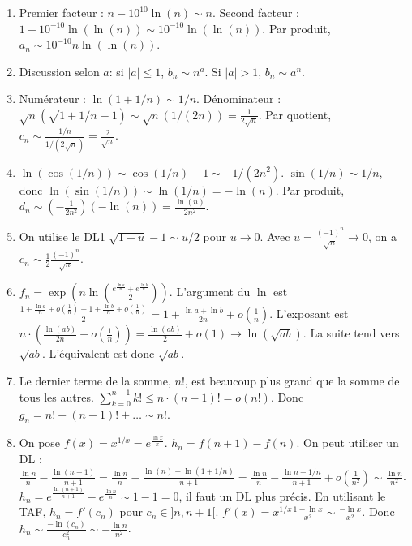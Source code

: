 \documentclass[solutions]{exercices}
\begin{document}
\begin{solution}
	\begin{enumerate}[]
		\item Premier facteur : $n - 10^{10} \ln(n) \sim n$. Second facteur : $1 + 10^{-10}\ln(\ln(n)) \sim 10^{-10}\ln(\ln(n))$. Par produit, $a_n \sim 10^{-10} n \ln(\ln(n))$.
		\item Discussion selon $a$: si $|a| \le 1$, $b_n \sim n^a$. Si $|a|>1$, $b_n \sim a^n$.
		\item Numérateur : $\ln(1+1/n) \sim 1/n$. Dénominateur : $\sqrt{n}(\sqrt{1+1/n}-1) \sim \sqrt{n}(1/(2n)) = \frac{1}{2\sqrt{n}}$.
		      Par quotient, $c_n \sim \frac{1/n}{1/(2\sqrt{n})} = \frac{2}{\sqrt{n}}$.
		\item $\ln(\cos(1/n)) \sim \cos(1/n)-1 \sim -1/(2n^2)$. $\sin(1/n) \sim 1/n$, donc $\ln(\sin(1/n)) \sim \ln(1/n) = -\ln(n)$.
		      Par produit, $d_n \sim (-\frac{1}{2n^2})(-\ln(n)) = \frac{\ln(n)}{2n^2}$.
		\item On utilise le DL1 $\sqrt{1+u}-1 \sim u/2$ pour $u\to 0$. Avec $u=\frac{(-1)^n}{\sqrt{n}} \to 0$, on a $e_n \sim \frac{1}{2}\frac{(-1)^n}{\sqrt{n}}$.
		\item $f_n = \exp\left(n\ln\left(\frac{e^{\frac{\ln a}{n}}+e^{\frac{\ln b}{n}}}{2}\right)\right)$.
		      L'argument du $\ln$ est $\frac{1+\frac{\ln a}{n}+o(\frac{1}{n}) + 1+\frac{\ln b}{n}+o(\frac{1}{n})}{2} = 1+\frac{\ln a+\ln b}{2n}+o(\frac{1}{n})$.
		      L'exposant est $n \cdot (\frac{\ln(ab)}{2n}+o(\frac{1}{n})) = \frac{\ln(ab)}{2}+o(1) \to \ln(\sqrt{ab})$.
		      La suite tend vers $\sqrt{ab}$. L'équivalent est donc $\sqrt{ab}$.
		\item Le dernier terme de la somme, $n!$, est beaucoup plus grand que la somme de tous les autres. $\sum_{k=0}^{n-1} k! \le n \cdot (n-1)! = o(n!)$.
		      Donc $g_n = n! + (n-1)! + \dots \sim n!$.
		\item On pose $f(x) = x^{1/x} = e^{\frac{\ln x}{x}}$. $h_n = f(n+1)-f(n)$. On peut utiliser un DL :
		      $\frac{\ln n}{n} - \frac{\ln(n+1)}{n+1} = \frac{\ln n}{n} - \frac{\ln(n)+\ln(1+1/n)}{n+1} = \frac{\ln n}{n} - \frac{\ln n + 1/n}{n+1} + o(\frac{1}{n^2}) \sim \frac{\ln n}{n^2}$.
		      $h_n = e^{\frac{\ln(n+1)}{n+1}} - e^{\frac{\ln n}{n}} \sim 1-1=0$, il faut un DL plus précis.
		      En utilisant le TAF, $h_n = f'(c_n)$ pour $c_n \in ]n, n+1[$. $f'(x) = x^{1/x} \frac{1-\ln x}{x^2} \sim \frac{-\ln x}{x^2}$.
		      Donc $h_n \sim \frac{-\ln(c_n)}{c_n^2} \sim -\frac{\ln n}{n^2}$.
	\end{enumerate}
\end{solution}
\end{document}
